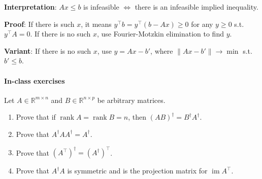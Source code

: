 \documentclass{article}
\begin{document}
\textbf{Interpretation}: $Ax \leq b$ is infeasible $\iff$ there is an infeasible implied inequality.

\textbf{Proof}: If there is such $x$, it means $y^\top b = y^\top (b - Ax) \geq 0$ for any $y \geq 0$ s.t. $y^\top A = 0$. If there is no such $x$, use Fourier-Motzkin elimination to find $y$.

\textbf{Variant}: If there is no such $x$, use $y = Ax - b'$, where $\|Ax-b'\| \to \min$ s.t. $b' \leq b$.

\paragraph{In-class exercises}

Let $A \in \mathbb{R}^{m \times n}$ and $B \in \mathbb R^{n \times p}$ be arbitrary matrices.

\begin{enumerate}
    \item Prove that if $\operatorname{rank} A = \operatorname{rank} B = n$, then $(AB)^\dagger = B^\dagger A^\dagger$.
    \item Prove that $A^\dagger A A^\dagger = A^\dagger$.
    \item Prove that $(A^\top)^\dagger = (A^\dagger)^\top$.
    \item Prove that $A^\dagger A$ is symmetric and is the projection matrix for $\operatorname{im} A^\top$.
\end{enumerate}
\end{document}

